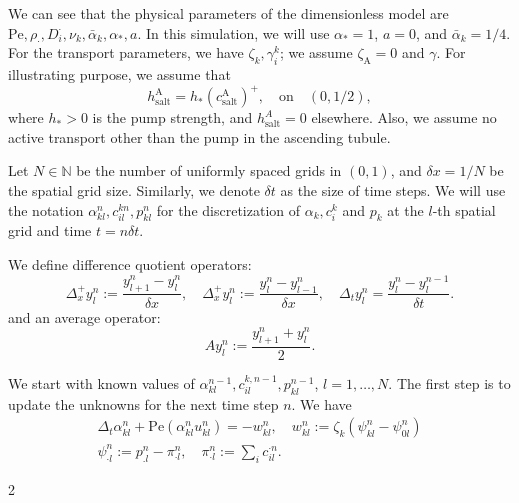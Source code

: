 \documentclass{article}
\begin{document}
    We can see that the physical parameters of the dimensionless model are $\mathrm{Pe},\rho_\cdot, D_i^\cdot, \nu_k, \bar{\alpha}_k, \alpha_*,a$.
    In this simulation, we will use $\alpha_* = 1$, $a=0$, and $\bar{\alpha}_k = 1/4$.
    For the transport parameters, we have $\zeta_k,\gamma_i^k$; we assume $\zeta_\mathrm{A} = 0$ and $\gamma$.
    For illustrating purpose, we assume that
    \begin{equation}
        h_\mathrm{salt}^\mathrm{A} = h_*(c_\mathrm{salt}^\mathrm{A})^+,\quad \text{on}\quad (0,1/2),
    \end{equation}
        where $h_*>0$ is the pump strength, and $h^A_\mathrm{salt} = 0$ elsewhere.
    Also, we assume no active transport other than the pump in the ascending tubule.

Let $N\in \mathbb{N}$ be the number of uniformly spaced grids in $(0,1)$, and $\delta x = 1/N$ be the spatial grid size.
Similarly, we denote $\delta t$ as the size of time steps.
We will use the notation $\alpha^{n}_{kl},c_{il}^{kn}, p_{kl}^{n}$ for the discretization of $\alpha_k,c_i^k$ and $p_k$ at the $l$-th spatial grid and time $t = n\delta t$.

We define difference quotient operators:
\begin{equation}
    \Delta_x^+y^n_l:= \frac{y^n_{l+1}-y^n_{l}}{\delta x},\quad \Delta_x^+ y^n_l :=\frac{y^n_l-y^n_{l-1}}{\delta x},\quad \Delta_t y^n_l = \frac{y^n_l - y^{n-1}_l}{\delta t}.
\end{equation}
and an average operator:
\begin{equation}
    Ay_l^n := \frac{y^n_{l+1}+y^n_l}{2}.
\end{equation}

We start with known values of $\alpha^{n-1}_{kl},c_{il}^{k,n-1}, p_{kl}^{n-1}$, $l = 1,\dots,N$.
The first step is to update the unknowns for the next time step $n$.
We have
\begin{gather}
    \Delta_t \alpha_{kl}^n +\mathrm{Pe}(\alpha_{kl}^n u_{kl}^n) = -w_{kl}^{n},\quad w_{kl}^n:=\zeta_k\left( \psi_{kl}^n-\psi_{0l}^n \right)\\
    \psi_{\cdot l}^n:= p_{.l}^n - \pi_{\cdot l}^n,\quad \pi_{\cdot l}^n:= \sum_i c_{il}^{\cdot n}.\nonumber
\end{gather}

2
\end{document}
